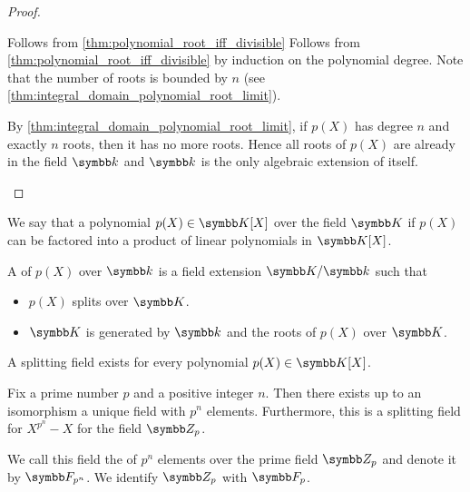 \begin{proof}
\begin{description}
     Follows from \cref{thm:polynomial_root_iff_divisible} Follows from \cref{thm:polynomial_root_iff_divisible} by induction on the polynomial degree. Note that the number of roots is bounded by \( n \) (see \cref{thm:integral_domain_polynomial_root_limit}).

     By \cref{thm:integral_domain_polynomial_root_limit}, if \( p(X) \) has degree \( n \) and exactly \( n \) roots, then it has no more roots. Hence all roots of \( p(X) \) are already in the field \( \k \) and \( \k \) is the only algebraic extension of itself.
  \end{description}
\end{proof}

\begin{definition}\label{def:splitting_field}\cite[458]{Knapp2016BAlg}
  We say that a polynomial \( p(X) \in \K[X] \) over the field \( \K \)  if \( p(X) \) can be factored into a product of linear polynomials in \( \K[X] \).

  A  of \( p(X) \) over \( \k \) is a field extension \( \K / \k \) such that
  \begin{itemize}
    \item \( p(X) \) splits over \( \K \).
    \item \( \K \) is generated by \( \k \) and the roots of \( p(X) \) over \( \K \).
  \end{itemize}
\end{definition}

\begin{proposition}\label{thm:splitting_field_existence}\cite[theorem 9.12]{Knapp2016BAlg}
  A splitting field exists for every polynomial \( p(X) \in \K[X] \).
\end{proposition}

\begin{theorem}\label{thm:galois_field_existence}\cite[theorem 9.14]{Knapp2016BAlg}
  Fix a prime number \( p \) and a positive integer \( n \). Then there exists up to an isomorphism a unique field with \( p^n \) elements. Furthermore, this is a splitting field for \( X^{p^n} - X \) for the field \( \Z_p \).

  We call this field the  of \( p^n \) elements over the prime field \( \Z_p \) and denote it by
  \( \Fld_{p^n} \). We identify \( \Z_p \) with \( \Fld_p \).
\end{theorem}

